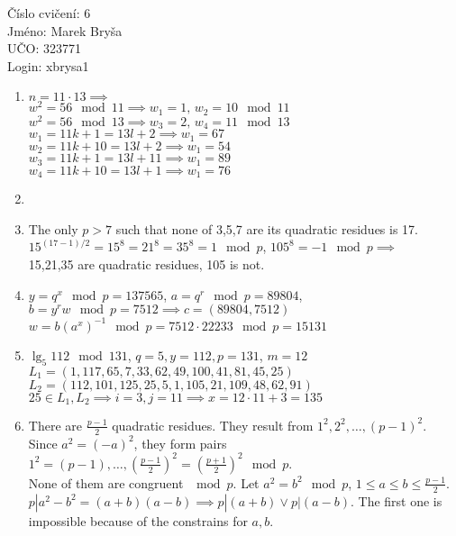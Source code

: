 \documentclass[a4paper,12pt]{extarticle}
\begin{document}
\begin{flushleft}
Číslo cvičení: 6 \\ 
Jméno: Marek Bryša \\
UČO: 323771\\
Login: xbrysa1\\
\end{flushleft}
\begin{enumerate}
  \item
    $n=11\cdot13 \implies$\\
    $w^2=56 \mod 11\implies w_1=1,\, w_2=10 \mod 11$\\
    $w^2=56 \mod 13\implies w_3=2,\, w_4=11 \mod 13$\\
    $w_1=11k+1=13l+2 \implies w_1=67$\\
    $w_2=11k+10=13l+2 \implies w_1=54$\\
    $w_3=11k+1=13l+11 \implies w_1=89$\\
    $w_4=11k+10=13l+1 \implies w_1=76$\\
  \item
  \item
    The only $p> 7$ such that none of 3,5,7 are its quadratic residues is 17.\\
    $15^{(17-1)/2}=15^8 = 21^8 = 35^8 = 1 \mod p$, $105^8=-1 \mod p\implies$\\
    15,21,35 are quadratic residues, 105 is not.
  \item
    $y=q^x \mod p=137565$, $a=q^r \mod p=89804$, $b=y^r w \mod p = 7512\implies c=(89804,7512)$\\
    $w=b(a^x)^{-1} \mod p=7512\cdot 22233\mod p = 15131 $
  \item
    $\lg_5 112 \mod 131$, $q=5,y=112,p=131$, $m=12$\\
    $L_1=(1, 117, 65, 7, 33, 62, 49, 100, 41, 81, 45, 25)$\\
    $L_2=(112, 101, 125, 25, 5, 1, 105, 21, 109, 48, 62, 91)$\\
    $25\in L_1,L_2 \implies i=3, j=11\implies x = 12\cdot11+3= 135$
  \item
    There are $\frac{p-1}{2}$ quadratic residues. They result from $1^2,2^2,\dots,(p-1)^2$.\\
    Since $a^2=(-a)^2$, they form pairs $1^2=(p-1),\dots,(\frac{p-1}{2})^2=(\frac{p+1}{2})^2 \mod p$.\\
    None of them are congruent $\mod p$. Let $a^2=b^2 \mod p$, $1\leq a\leq b\leq\frac{p-1}{2}$.\\
    $p|a^2-b^2=(a+b)(a-b) \implies p|(a+b) \vee p|(a-b)$. The first one is impossible because of the constrains for $a,b$.

\end{enumerate}
\end{document}
